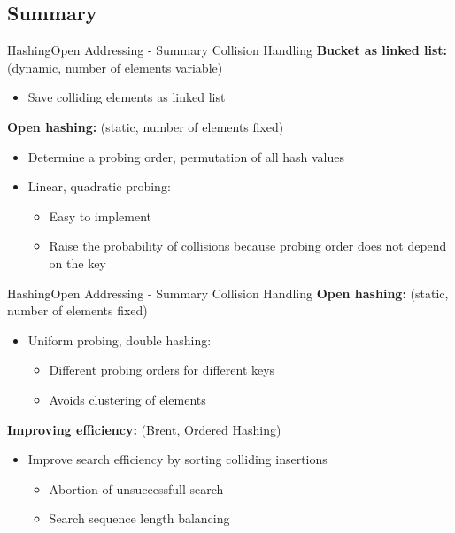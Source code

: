 
\subsection{Summary}

\begin{frame}{Hashing}{Open Addressing - Summary Collision Handling}
  \textbf{Bucket as linked list:}
  {\color{Mittel-Blau}(dynamic, number of elements variable)}
  \begin{itemize}
    \item
      Save colliding elements as linked list
  \end{itemize}
  \vspace{1.0em}
  \textbf{Open hashing:}
  {\color{Mittel-Blau}(static, number of elements fixed)}
  \begin{itemize}
    \item
      Determine a probing order, permutation of all hash values
    \item
      Linear, quadratic probing:
      \begin{itemize}
        \item
          Easy to implement
        \item
          Raise the probability of collisions because probing order does
          not depend on the key
      \end{itemize}
  \end{itemize}
\end{frame}


\begin{frame}{Hashing}{Open Addressing - Summary Collision Handling}
  \textbf{Open hashing:}
  {\color{Mittel-Blau}(static, number of elements fixed)}
  \begin{itemize}
    \item
      Uniform probing, double hashing:
      \begin{itemize}
        \item
          Different probing orders for different keys
        \item
          Avoids clustering of elements
      \end{itemize}
  \end{itemize}
  \vspace{1.0em}
  \textbf{Improving efficiency:}
  {\color{Mittel-Blau}(Brent, Ordered Hashing)}
  \begin{itemize}
    \item
      Improve search efficiency by sorting colliding insertions
      \begin{itemize}
        \item
          Abortion of unsuccessfull search
        \item
          Search sequence length balancing
      \end{itemize}
  \end{itemize}
\end{frame}


